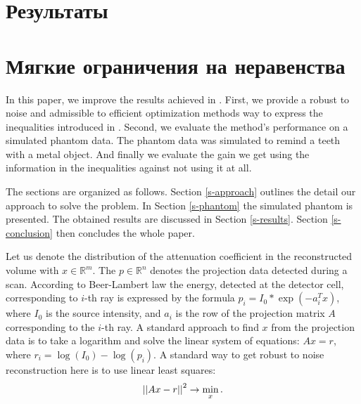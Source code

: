 \section{Результаты} \label{sect_2_1_2}


\section{Мягкие ограничения на неравенства} \label{sect_2_2}

In this paper, we improve the results achieved in \cite{chukalinaway}. First, we provide a robust to noise and admissible to efficient optimization methods way to express the inequalities introduced in \cite{chukalinaway}. Second, we evaluate the method's performance on a simulated phantom data. The phantom data was simulated to remind a teeth with a metal object. And finally we evaluate the gain we get using the information in the inequalities against not using it at all.

The sections are organized as follows. Section \ref{s-approach} outlines the detail our approach to solve the problem. In Section \ref{s-phantom} the simulated phantom is presented. The obtained results are discussed in Section \ref{s-results}. Section \ref{s-conclusion} then concludes the whole paper.

\label{s-approach}
Let us denote the distribution of the attenuation coefficient in the reconstructed volume with $x \in \mathbb{R}^m$. The $p \in \mathbb{R}^n$ denotes the projection data detected during a scan. According to Beer-Lambert law the energy, detected at the detector cell, corresponding to $i$-th ray is expressed by the formula $p_i = I_0 * \exp(-a_i^T x)$, where $I_0$ is the source intensity, and $a_i$ is the row of the projection matrix $A$ corresponding to the $i$-th ray. A standard approach to find $x$ from the projection data is to take a logarithm and solve the linear system of equations: $Ax = r$, where
$r_i = \log(I_0) - \log(p_i)$. A standard way to get robust to noise reconstruction here is to use linear least squares:
\begin{equation} \label{eq:lls}
  \left|\left| Ax - r \right|\right|^2 \to \min\limits_{x}.
\end{equation}

